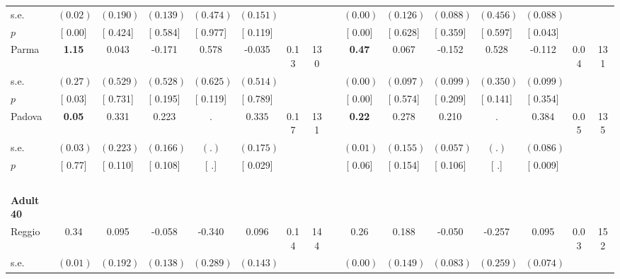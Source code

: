 \begin{longtable}{L{8em} c c c c c c c p{1em} c c c c c c c}
\quad \quad \quad \quad s.e.& $ (     0.02)$ & $ (    0.190)$ & $ (    0.139)$ & $ (    0.474)$ & $ (    0.151)$ & & & & $ (     0.00)$ & $ (    0.126)$ & $ (    0.088)$ & $ (    0.456)$ & $ (    0.088)$ & &  \\*
\quad \quad \quad \quad $ p$ & [     0.00] & [    0.424] & [    0.584] & [    0.977] & [    0.119] & & & & [     0.00] & [    0.628] & [    0.359] & [    0.597] & [    0.043] & &  \\[1em]
\quad \quad \quad Parma& \textbf{     1.15} &     0.043 &    -0.171 &     0.578 &    -0.035 &      0.13 &       130 & & \textbf{     0.47} &     0.067 &    -0.152 &     0.528 &    -0.112 &      0.04 &       131  \\*
\quad \quad \quad \quad s.e.& $ (     0.27)$ & $ (    0.529)$ & $ (    0.528)$ & $ (    0.625)$ & $ (    0.514)$ & & & & $ (     0.00)$ & $ (    0.097)$ & $ (    0.099)$ & $ (    0.350)$ & $ (    0.099)$ & &  \\*
\quad \quad \quad \quad $ p$ & [     0.03] & [    0.731] & [    0.195] & [    0.119] & [    0.789] & & & & [     0.00] & [    0.574] & [    0.209] & [    0.141] & [    0.354] & &  \\[1em]
\quad \quad \quad Padova& \textbf{     0.05} &     0.331 &     0.223 &         . & $ \mathbf{    0.335}$ &      0.17 &       131 & & \textbf{     0.22} &     0.278 &     0.210 &         . & $ \mathbf{    0.384}$ &      0.05 &       135  \\*
\quad \quad \quad \quad s.e.& $ (     0.03)$ & $ (    0.223)$ & $ (    0.166)$ & $ (        .)$ & $ (    0.175)$ & & & & $ (     0.01)$ & $ (    0.155)$ & $ (    0.057)$ & $ (        .)$ & $ (    0.086)$ & &  \\*
\quad \quad \quad \quad $ p$ & [     0.77] & [    0.110] & [    0.108] & [        .] & [    0.029] & & & & [     0.06] & [    0.154] & [    0.106] & [        .] & [    0.009] & &  \\[1em]
~\\[1em]
\quad \quad \textbf{Adult 40} & & & & & & & & & & & & & & & \\* 
\quad \quad \quad Reggio& 0.34 &     0.095 &    -0.058 &    -0.340 &     0.096 &      0.14 &       144 & & 0.26 &     0.188 &    -0.050 &    -0.257 &     0.095 &      0.03 &       152  \\*
\quad \quad \quad \quad s.e.& $ (     0.01)$ & $ (    0.192)$ & $ (    0.138)$ & $ (    0.289)$ & $ (    0.143)$ & & & & $ (     0.00)$ & $ (    0.149)$ & $ (    0.083)$ & $ (    0.259)$ & $ (    0.074)$ & &  \\*

\end{longtable}
